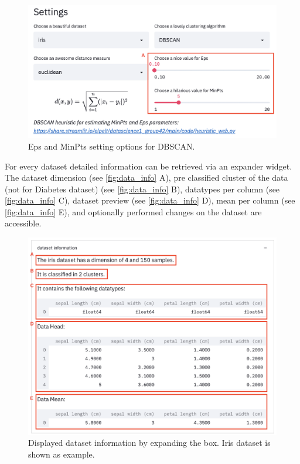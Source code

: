 \begin{figure}[H]
	\centering
	\includegraphics[width=\linewidth]{modules/web_frontend/DBSCAN_settings.png}
	\caption{Eps and MinPts setting options for DBSCAN.}\label{fig:dbscan_para}
\end{figure}

For every dataset detailed information can be retrieved via an expander widget. The dataset dimension (see \autoref{fig:data_info} A), pre classified cluster of the data (not for Diabetes dataset) (see \autoref{fig:data_info} B), datatypes per column (see \autoref{fig:data_info} C), dataset preview (see \autoref{fig:data_info} D), mean per column (see \autoref{fig:data_info} E), and optionally performed changes on the dataset are accessible.

\begin{figure}[H]
	\centering
	\includegraphics[width=\linewidth]{modules/web_frontend/dataset_inofs.png}
	\caption{Displayed dataset information by expanding the box. Iris dataset is shown as example.}\label{fig:data_info}
\end{figure}

